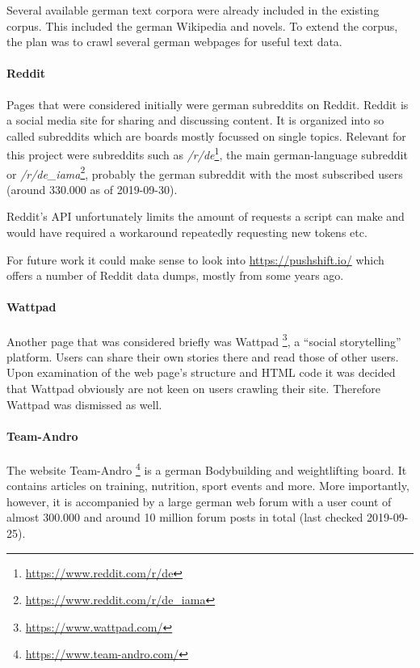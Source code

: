 \documentclass{scrartcl}
\begin{document}
Several available german text corpora were already included in the existing corpus. This included the german Wikipedia and novels. 
To extend the corpus, the plan was to crawl several german webpages for useful text data.

\paragraph{Reddit}
Pages that were considered initially were german subreddits on Reddit. Reddit is a social media site for sharing and discussing content. It is organized into so called subreddits which are boards mostly focussed on single topics. Relevant for this project were subreddits such as \textit{/r/de}\footnote{\url{https://www.reddit.com/r/de}}, the main german-language subreddit or \textit{/r/de\_iama}\footnote{\url{https://www.reddit.com/r/de\_iama}}, probably the german subreddit with the most subscribed users (around 330.000 as of 2019-09-30).

Reddit's API unfortunately limits the amount of requests a script can make and would have required a workaround repeatedly requesting new tokens etc.

For future work it could make sense to look into \url{https://pushshift.io/} which offers a number of Reddit data dumps, mostly from some years ago.

\paragraph{Wattpad}

Another page that was considered briefly was Wattpad \footnote{\url{https://www.wattpad.com/}}, a \enquote{social storytelling} platform. Users can share their own stories there and read those of other users. Upon examination of the web page's structure and HTML code it was decided that Wattpad obviously are not keen on users crawling their site. Therefore Wattpad was dismissed as well.

\paragraph{Team-Andro} The website Team-Andro \footnote{\url{https://www.team-andro.com/}} is a german Bodybuilding and weightlifting board. It contains articles on training, nutrition, sport events and more. More importantly, however, it is accompanied by a large german web forum with a user count of almost 300.000 and around 10 million forum posts in total (last checked 2019-09-25).
\end{document}
